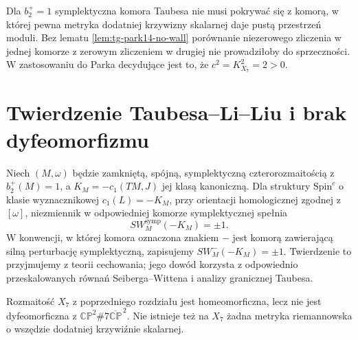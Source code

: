 \begin{uwaga}
Dla $b_2^+=1$ symplektyczna komora Taubesa nie musi
pokrywać się z komorą, w której pewna metryka dodatniej
krzywizny skalarnej daje pustą przestrzeń moduli.
Bez lematu \ref{lem:tg-park14-no-wall} porównanie
niezerowego zliczenia w jednej komorze z zerowym zliczeniem
w drugiej nie prowadziłoby do sprzeczności.
W zastosowaniu do Parka decydujące jest to, że
$c^2=K_{X_7}^2=2>0$.
\end{uwaga}

\section{Twierdzenie Taubesa--Li--Liu i brak dyfeomorfizmu}
\label{sec:tg-park14-exotic}

\begin{twierdzenie}
\label{thm:tg-park14-taubes}
Niech $(M,\omega)$ będzie zamkniętą, spójną,
symplektyczną czterorozmaitością z $b_2^+(M)=1$,
a $K_M=-c_1(TM,J)$ jej klasą kanoniczną.
Dla struktury $\mathrm{Spin}^c$ o klasie wyznacznikowej
$c_1(L)=-K_M$, przy orientacji homologicznej
zgodnej z $[\omega]$, niezmiennik w odpowiedniej
komorze symplektycznej spełnia
\[
SW_M^{\mathrm{symp}}(-K_M)=\pm1.
\]
W konwencji, w której komora oznaczona znakiem
$-$ jest komorą zawierającą silną perturbację
symplektyczną, zapisujemy $SW_M^-(-K_M)=\pm1$.
Twierdzenie to przyjmujemy z teorii cechowania;
jego dowód korzysta z odpowiednio przeskalowanych
równań Seiberga--Wittena i analizy granicznej Taubesa.
\end{twierdzenie}

\begin{twierdzenie}
\label{thm:tg-park14-exotic}
Rozmaitość $X_7$ z poprzedniego rozdziału jest
homeomorficzna, lecz nie jest dyfeomorficzna z
$\mathbb{CP}^{2}\#7\overline{\mathbb{CP}}^{\,2}$.
Nie istnieje też na $X_7$ żadna metryka riemannowska
o wszędzie dodatniej krzywiźnie skalarnej.
\end{twierdzenie}

